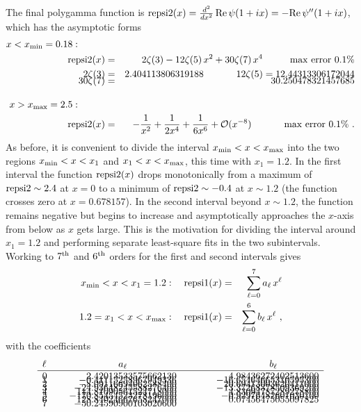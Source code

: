 \documentclass[preprint,12pt,eqsecnum,nofootinbib,amsmath,amssymb]{revtex4}
\begin{document}
The final polygamma function is ${\rm repsi2}(x)=\frac{d^2}{dx^2}\, 
{\rm Re}\, \psi(1 + i x)=- {\rm Re}\, \psi^{\prime\prime}(1 + i x)$,
which has the asymptotic forms
\begin{eqnarray}
  x < x_{\rm min}=0.18: \hskip1cm \\  
\nonumber
  {\rm repsi2}(x) &=& 2 \zeta(3)  - 12 \zeta(5) \, x^2
 + 30 \zeta(7)\, x^4
  \hskip1cm {\rm max~error~} 0.1\% 
\\ \nonumber
  2 \zeta(3) &=& 2.404113806319188
  \hskip1.2cm 
  12 \zeta(5)  = 12.44313306172044
\\[-8pt] \nonumber
  30 \zeta(7) &=& 30.250478321457685
\\[10pt]
\nonumber
  x > x_{\rm max}=2.5: \hskip1cm \\  
  {\rm repsi2}(x) &=& -\frac{1}{x^2} + \frac{1}{2 x^4} +
  \frac{1}{6 x^6} + {\cal O}(x^{-8})
  \hskip1.2cm {\rm max~error~} 0.1\% \ .
\end{eqnarray}
As before, it is convenient to divide the interval 
$x_{\rm min} < x < x_{\rm max}$ into the two regions
\hbox{$x_{\rm min} < x < x_1$} and $x_1< x < x_{\rm max}$,
this time with $x_1=1.2$. In the first interval the
function ${\rm repsi2}(x)$ drops monotonically from a 
maximum of ${\rm repsi2} \sim 2.4$ at $x=0$ to a minimum 
of ${\rm repsi2} \sim -0.4$ at $x \sim 1.2$ (the function
crosses zero at $x=0.678157$). In the second interval 
beyond $x \sim 1.2$, the function remains negative but
begins to increase and asymptotically approaches the 
$x$-axis from below as $x$ gets large. This is the
motivation for dividing the interval around $x_1=1.2$
and performing separate least-square fits in the two 
subintervals. Working to $7^{\rm th}$ and $6^{\rm th}$ 
orders for the first and second intervals gives 
\begin{eqnarray}
  x_{\rm min} < x < x_1=1.2 : ~~~
  {\rm repsi1}(x) &=& \sum_{\ell=0}^7 a_\ell\, x^\ell
\\
 1.2= x_1 < x < x_{\rm max}: ~~~
  {\rm repsi1}(x) &=& \sum_{\ell=0}^6 b_\ell\, x^\ell \ ,
\end{eqnarray}
with the coefficients
\begin{eqnarray}
  \begin{array}{lrr}
  \ell~~~~ & \hfill a_\ell \hfill & \hskip3cm b_\ell \hskip1.5cm  \\ \hline
  0    &   2.42013533575662130  &   4.98436272402513600  \\[-8pt]
  1    &  -0.41115258967949336  & -16.65464665310595300  \\[-8pt]
  2    &  -8.09116694062588400  &  20.69413003620411000  \\[-8pt]
  3    & -24.93648245588276400  & -13.37268378509369200  \\[-8pt]
  4    & 114.81090561524718000  &   4.83094787289278800  \\[-8pt]
  5    &-170.85454523278196000  &  -0.92976482601030100  \\[-8pt]
  6    & 128.84024667658247000  &   0.07456475055097825  \\[-8pt]
  7    & -50.24590900103020600  &  
  \end{array}  
\end{eqnarray}
\end{document}
